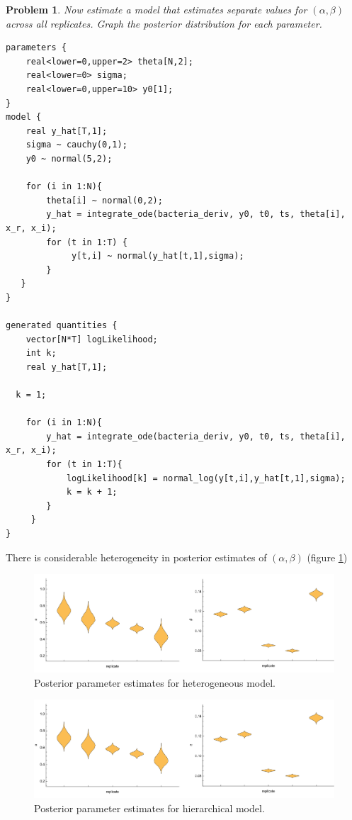 \documentclass{article}
\newtheorem{problem}{Problem}[section]
\begin{document}
\begin{problem}
	Now estimate a model that estimates separate values for $(\alpha,\beta)$ across all replicates. Graph the posterior distribution for each parameter.
\end{problem}

\begin{verbatim}
parameters {
    real<lower=0,upper=2> theta[N,2];
    real<lower=0> sigma;
    real<lower=0,upper=10> y0[1];
}
model {
    real y_hat[T,1];
    sigma ~ cauchy(0,1);
    y0 ~ normal(5,2);
  
    for (i in 1:N){
        theta[i] ~ normal(0,2);
        y_hat = integrate_ode(bacteria_deriv, y0, t0, ts, theta[i], x_r, x_i);
        for (t in 1:T) {
             y[t,i] ~ normal(y_hat[t,1],sigma);
        }
   }
}

generated quantities {
    vector[N*T] logLikelihood;
    int k;
    real y_hat[T,1];
  
  k = 1;

    for (i in 1:N){
        y_hat = integrate_ode(bacteria_deriv, y0, t0, ts, theta[i], x_r, x_i);
        for (t in 1:T){
            logLikelihood[k] = normal_log(y[t,i],y_hat[t,1],sigma);
            k = k + 1;
        }
     }
}
\end{verbatim}


There is considerable heterogeneity in posterior estimates of $(\alpha,\beta)$ (figure \ref{fig:posterior_hetero})

\begin{figure}[ht]
	\centerline{\includegraphics[width=1\textwidth]{figures/prob6_heteroAlphaBeta.pdf}}
	\caption{Posterior parameter estimates for heterogeneous model.}\label{fig:posterior_hetero}
\end{figure}

\begin{figure}[ht]
	\centerline{\includegraphics[width=1\textwidth]{figures/prob6_hierAlphaBeta.pdf}}
	\caption{Posterior parameter estimates for hierarchical model.}\label{fig:posterior_hier}
\end{figure}
\end{document}
